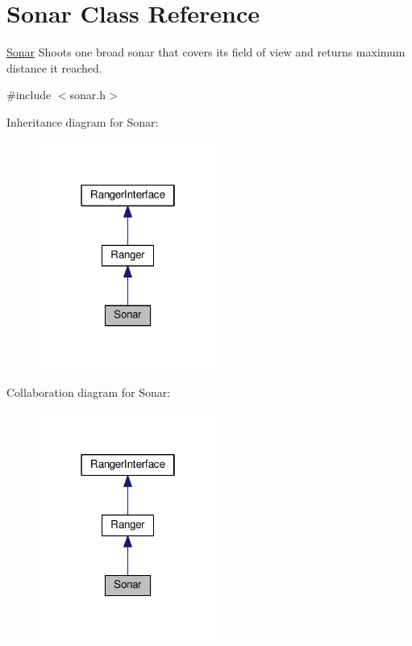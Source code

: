 \hypertarget{class_sonar}{}\section{Sonar Class Reference}
\label{class_sonar}


\hyperlink{class_sonar}{Sonar} Shoots one broad sonar that covers its field of view and returns maximum distance it reached.  




{\ttfamily \#include $<$sonar.\+h$>$}



Inheritance diagram for Sonar\+:
\nopagebreak
\begin{figure}[H]
\begin{center}
\leavevmode
\includegraphics[width=166pt]{class_sonar__inherit__graph}
\end{center}
\end{figure}


Collaboration diagram for Sonar\+:
\nopagebreak
\begin{figure}[H]
\begin{center}
\leavevmode
\includegraphics[width=166pt]{class_sonar__coll__graph}
\end{center}
\end{figure}
